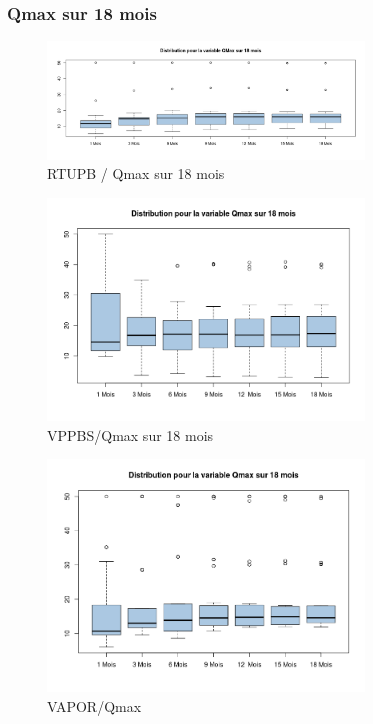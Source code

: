 %
%

\subsubsection{Qmax sur 18 mois }

\begin{figure}[H]
\centering
\includegraphics[width=0.75\textwidth]{../Fig/RTUPB/rtupb-boxplot-post-Qmax}
\caption{RTUPB / Qmax sur 18 mois}
\end{figure}	
	
\begin{figure}[H]
\centering
\includegraphics[width=0.75\textwidth]{../Fig/VPPBS/vppbs-boxplot-post-Qmax}
\caption{VPPBS/Qmax sur 18 mois}
\end{figure}


\begin{figure}[H]
\centering
\includegraphics[width=0.75\textwidth]{../Fig/VAPOR/vapor-boxplot-post-Qmax}
\caption{VAPOR/Qmax}
\end{figure}

%
